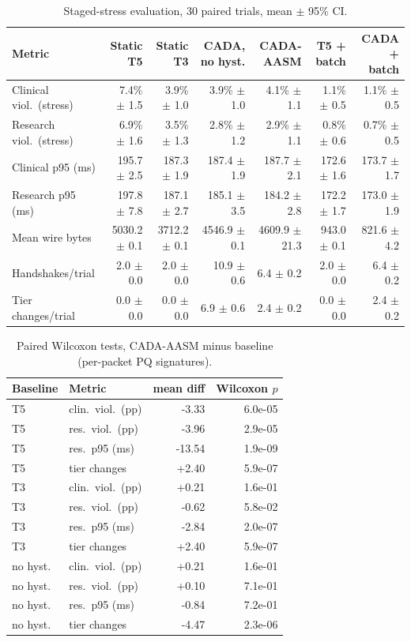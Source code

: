 \begin{table}[t]\centering\caption{Staged-stress evaluation, 30 paired trials, mean $\pm$ 95\% CI.}\label{tab:main}\small
\begin{tabular}{lrrrrrr}\toprule
Metric & Static T5 & Static T3 & CADA, no hyst. & CADA-AASM & T5 + batch & CADA + batch \\\midrule
Clinical viol.\ (stress) & 7.4\% $\pm$ 1.5 & 3.9\% $\pm$ 1.0 & 3.9\% $\pm$ 1.0 & 4.1\% $\pm$ 1.1 & 1.1\% $\pm$ 0.5 & 1.1\% $\pm$ 0.5 \\
Research viol.\ (stress) & 6.9\% $\pm$ 1.6 & 3.5\% $\pm$ 1.3 & 2.8\% $\pm$ 1.2 & 2.9\% $\pm$ 1.1 & 0.8\% $\pm$ 0.6 & 0.7\% $\pm$ 0.5 \\
Clinical p95 (ms) & 195.7 $\pm$ 2.5 & 187.3 $\pm$ 1.9 & 187.4 $\pm$ 1.9 & 187.7 $\pm$ 2.1 & 172.6 $\pm$ 1.6 & 173.7 $\pm$ 1.7 \\
Research p95 (ms) & 197.8 $\pm$ 7.8 & 187.1 $\pm$ 2.7 & 185.1 $\pm$ 3.5 & 184.2 $\pm$ 2.8 & 172.2 $\pm$ 1.7 & 173.0 $\pm$ 1.9 \\
Mean wire bytes & 5030.2 $\pm$ 0.1 & 3712.2 $\pm$ 0.1 & 4546.9 $\pm$ 0.1 & 4609.9 $\pm$ 21.3 & 943.0 $\pm$ 0.1 & 821.6 $\pm$ 4.2 \\
Handshakes/trial & 2.0 $\pm$ 0.0 & 2.0 $\pm$ 0.0 & 10.9 $\pm$ 0.6 & 6.4 $\pm$ 0.2 & 2.0 $\pm$ 0.0 & 6.4 $\pm$ 0.2 \\
Tier changes/trial & 0.0 $\pm$ 0.0 & 0.0 $\pm$ 0.0 & 6.9 $\pm$ 0.6 & 2.4 $\pm$ 0.2 & 0.0 $\pm$ 0.0 & 2.4 $\pm$ 0.2 \\
\bottomrule\end{tabular}\end{table}

\begin{table}[t]\centering\caption{Paired Wilcoxon tests, CADA-AASM minus baseline (per-packet PQ signatures).}\label{tab:tests}\small
\begin{tabular}{llrr}\toprule
Baseline & Metric & mean diff & Wilcoxon $p$ \\\midrule
T5 & clin.\ viol.\ (pp) & -3.33 & 6.0e-05 \\
T5 & res.\ viol.\ (pp) & -3.96 & 2.9e-05 \\
T5 & res.\ p95 (ms) & -13.54 & 1.9e-09 \\
T5 & tier changes & +2.40 & 5.9e-07 \\
T3 & clin.\ viol.\ (pp) & +0.21 & 1.6e-01 \\
T3 & res.\ viol.\ (pp) & -0.62 & 5.8e-02 \\
T3 & res.\ p95 (ms) & -2.84 & 2.0e-07 \\
T3 & tier changes & +2.40 & 5.9e-07 \\
no hyst. & clin.\ viol.\ (pp) & +0.21 & 1.6e-01 \\
no hyst. & res.\ viol.\ (pp) & +0.10 & 7.1e-01 \\
no hyst. & res.\ p95 (ms) & -0.84 & 7.2e-01 \\
no hyst. & tier changes & -4.47 & 2.3e-06 \\
\bottomrule\end{tabular}\end{table}

